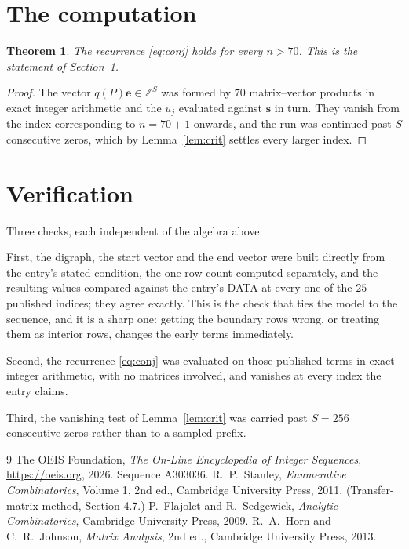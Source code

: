 \documentclass[11pt,a4paper]{article}
\theoremstyle{plain}
\newtheorem{theorem}{Theorem}
\theoremstyle{definition}
\begin{document}
\section{The computation}

\begin{theorem}
The recurrence \eqref{eq:conj} holds for every $n>70$. This is the statement of
Section~1.
\end{theorem}

\begin{proof}
The vector $q(P)\mathbf{e}\in\mathbb{Z}^{S}$ was formed by $70$ matrix--vector
products in exact integer arithmetic and the $u_j$ evaluated against $\mathbf{s}$ in turn.
They vanish from the index corresponding to $n=70+1$ onwards, and the run was continued
past $S$ consecutive zeros, which by Lemma~\ref{lem:crit} settles every larger index.
\end{proof}

\section{Verification}

Three checks, each independent of the algebra above.

First, the digraph, the start vector and the end vector were built directly from the
entry's stated condition, the one-row count computed separately, and the resulting values
compared against the entry's DATA at every one of the $25$ published indices; they
agree exactly. This is the check that ties the model to the sequence, and it is a sharp one:
getting the boundary rows wrong, or treating them as interior rows, changes the early terms
immediately.

Second, the recurrence \eqref{eq:conj} was evaluated on those published terms in exact
integer arithmetic, with no matrices involved, and vanishes at every index the entry claims.

Third, the vanishing test of Lemma~\ref{lem:crit} was carried past $S=256$ consecutive
zeros rather than to a sampled prefix.

\begin{thebibliography}{9}
 The OEIS Foundation, \emph{The On-Line Encyclopedia of Integer
Sequences}, \url{https://oeis.org}, 2026. Sequence A303036.
 R.~P.~Stanley, \emph{Enumerative Combinatorics}, Volume 1, 2nd ed.,
Cambridge University Press, 2011. (Transfer-matrix method, Section 4.7.)
 P.~Flajolet and R.~Sedgewick, \emph{Analytic Combinatorics}, Cambridge
University Press, 2009.
 R.~A.~Horn and C.~R.~Johnson, \emph{Matrix Analysis}, 2nd ed., Cambridge
University Press, 2013.
\end{thebibliography}
\end{document}

